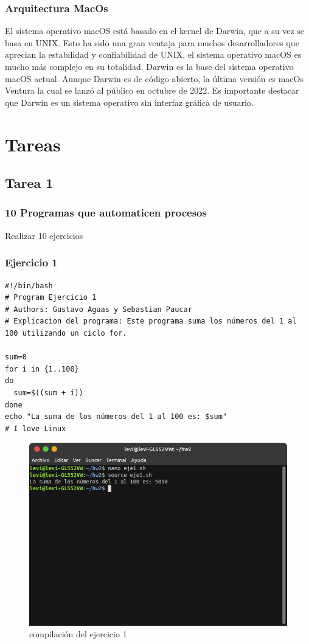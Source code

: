 \documentclass[11pt,twoside]{book}
\begin{document}
\subsection{Arquitectura MacOs}
El sistema operativo macOS está basado en el kernel de Darwin, que a su vez se basa en UNIX. Esto ha sido una gran ventaja para muchos desarrolladores que aprecian la estabilidad y confiabilidad de UNIX, el sistema operativo macOS es mucho más complejo en su totalidad. Darwin es la base del sistema operativo macOS actual. Aunque Darwin es de código abierto, la última versión es macOs Ventura la cual se lanzó al público en octubre de 2022. Es importante destacar que Darwin es un sistema operativo sin interfaz gráfica de usuario.

\vspace{5pt}

\newpage
\chapter{Tareas}

\section{Tarea 1}
\subsection{10 Programas que automaticen procesos}
Realizar 10 ejercicios
\subsection{Ejercicio 1}
\begin{lstlisting}
#!/bin/bash
# Program Ejercicio 1
# Authors: Gustavo Aguas y Sebastian Paucar
# Explicacion del programa: Este programa suma los números del 1 al 100 utilizando un ciclo for.

sum=0
for i in {1..100}
do
  sum=$((sum + i))
done
echo "La suma de los números del 1 al 100 es: $sum"
# I love Linux
\end{lstlisting}
\begin{figure}[h]
    \centering
    \includegraphics[width=0.8\linewidth]{Tarea2/teje1.png}
    \caption{ compilación del ejercicio 1}
\end{figure}
\end{document}
